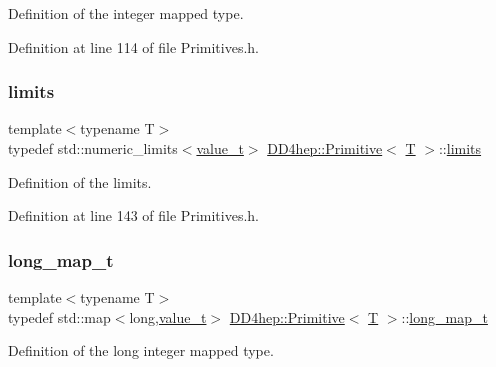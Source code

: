 Definition of the integer mapped type. 



Definition at line 114 of file Primitives.\+h.

\hypertarget{struct_d_d4hep_1_1_primitive_a9f6d14410388a5c8067d274030dbdc3c}{}\label{struct_d_d4hep_1_1_primitive_a9f6d14410388a5c8067d274030dbdc3c} 
\subsubsection{\texorpdfstring{limits}{limits}}
{\footnotesize\ttfamily template$<$typename T$>$ \\
typedef std\+::numeric\+\_\+limits$<$\hyperlink{struct_d_d4hep_1_1_primitive_a0639e73bb8f07f99c2d8401f807a7af6}{value\+\_\+t}$>$ \hyperlink{struct_d_d4hep_1_1_primitive}{D\+D4hep\+::\+Primitive}$<$ \hyperlink{class_t}{T} $>$\+::\hyperlink{struct_d_d4hep_1_1_primitive_a9f6d14410388a5c8067d274030dbdc3c}{limits}}



Definition of the limits. 



Definition at line 143 of file Primitives.\+h.

\hypertarget{struct_d_d4hep_1_1_primitive_ad93415660e6d4d711daa9d9135c6e2b5}{}\label{struct_d_d4hep_1_1_primitive_ad93415660e6d4d711daa9d9135c6e2b5} 
\subsubsection{\texorpdfstring{long\+\_\+map\+\_\+t}{long\_map\_t}}
{\footnotesize\ttfamily template$<$typename T$>$ \\
typedef std\+::map$<$long,\hyperlink{struct_d_d4hep_1_1_primitive_a0639e73bb8f07f99c2d8401f807a7af6}{value\+\_\+t}$>$ \hyperlink{struct_d_d4hep_1_1_primitive}{D\+D4hep\+::\+Primitive}$<$ \hyperlink{class_t}{T} $>$\+::\hyperlink{struct_d_d4hep_1_1_primitive_ad93415660e6d4d711daa9d9135c6e2b5}{long\+\_\+map\+\_\+t}}



Definition of the long integer mapped type. 




